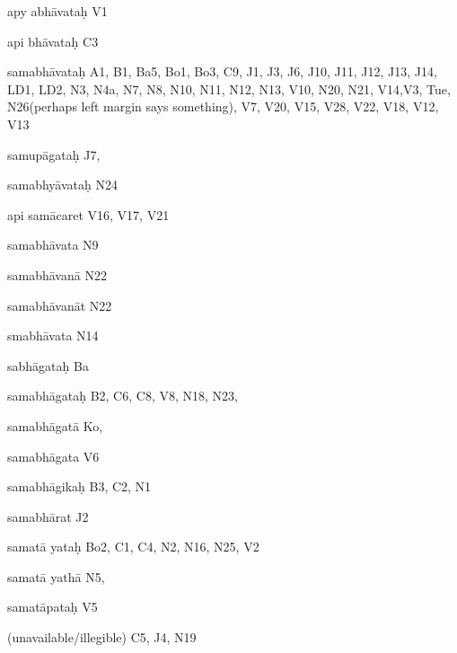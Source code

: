 \begin{ekdosis}
\begin{marma}[hp01_055]
\begin{marma}[hp02_009]
\begin{marma}[hp02_011]
\begin{marma}[hp02_021]
\begin{description}
          \end{description}
        \end{marma}


        \begin{marma}[hp02_021d]
        \item[apy abhāvataḥ] V1
        \item[api bhāvataḥ] C3
        \item[samabhāvataḥ] A1, B1, Ba5, Bo1, Bo3, C9, J1, J3, J6, J10, J11, J12, J13, J14, LD1, LD2, N3, N4a, N7, N8, N10, N11, N12, N13, V10, N20, N21, V14,V3, Tue, N26(perhaps left margin says something), V7, V20, V15, V28, V22, V18, V12, V13
        \item[samupāgataḥ] J7,
        \item[samabhyāvataḥ] N24
        \item[api samācaret] V16, V17, V21
        \item[samabhāvata]  N9
        \item[samabhāvanā] N22
        \item[samabhāvanāt] N22
        \item[smabhāvata]  N14
        \item[sabhāgataḥ] Ba
        \item[samabhāgataḥ] B2, C6, C8, V8, N18, N23, 
        \item[samabhāgatā] Ko,
        \item[samabhāgata] V6
        \item[samabhāgikaḥ] B3, C2, N1
        \item[samabhārat] J2
        \item[samatā yataḥ]  Bo2, C1, C4, N2, N16, N25, V2
        \item[samatā yathā]   N5,
        \item[samatāpataḥ] V5
        \item[(unavailable/illegible)] C5, J4, N19
          \begin{description}

          \end{description}
        \end{marma}


        \begin{marma}[hp02_022a-c]
          \sthana{}
          \begin{description}
          \end{description}
        \end{marma}



\end{marma}
\end{marma}
\end{marma}
\end{ekdosis}
